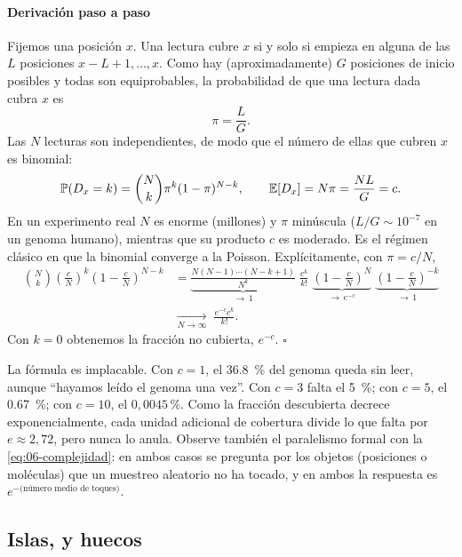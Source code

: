 \paragraph{Derivación paso a paso} Fijemos una posición $x$. Una lectura cubre $x$ si y solo si empieza en alguna de las $L$ posiciones $x-L+1,\dots,x$. Como hay (aproximadamente) $G$ posiciones de inicio posibles y todas son equiprobables, la probabilidad de que una lectura dada cubra $x$ es
\[
\pi = \frac{L}{G}.
\]
Las $N$ lecturas son independientes, de modo que el número de ellas que cubren $x$ es binomial:
\[
\mathbb{P}(D_x=k)=\binom{N}{k}\pi^k(1-\pi)^{N-k},\qquad \mathbb{E}[D_x]=N\pi=\frac{NL}{G}=c.
\]
En un experimento real $N$ es enorme (millones) y $\pi$ minúscula ($L/G\sim10^{-7}$ en un genoma humano), mientras que su producto $c$ es moderado. Es el régimen clásico en que la binomial converge a la Poisson. Explícitamente, con $\pi=c/N$,
\[
\begin{aligned}
\binom{N}{k}\left(\frac{c}{N}\right)^k\left(1-\frac{c}{N}\right)^{N-k}
&= \underbrace{\frac{N(N-1)\cdots(N-k+1)}{N^k}}_{\to\,1}\;\frac{c^k}{k!}\;
\underbrace{\left(1-\frac{c}{N}\right)^{N}}_{\to\,e^{-c}}\;
\underbrace{\left(1-\frac{c}{N}\right)^{-k}}_{\to\,1}\\[4pt]
&\xrightarrow[N\to\infty]{}\;\frac{e^{-c}c^k}{k!}.
\end{aligned}
\]
Con $k=0$ obtenemos la fracción no cubierta, $e^{-c}$. $\square$

\begin{simbolos}
\end{simbolos}

La fórmula es implacable. Con $c=1$, el \SI{36,8}{\percent} del genoma queda sin leer, aunque ``hayamos leído el genoma una vez''. Con $c=3$ falta el \SI{5}{\percent}; con $c=5$, el \SI{0,67}{\percent}; con $c=10$, el $0{,}0045\,\%$. Como la fracción descubierta decrece exponencialmente, cada unidad adicional de cobertura divide lo que falta por $e\approx2{,}72$, pero nunca lo anula. Observe también el paralelismo formal con la \cref{eq:06-complejidad}: en ambos casos se pregunta por los objetos (posiciones o moléculas) que un muestreo aleatorio no ha tocado, y en ambos la respuesta es $e^{-\text{(número medio de toques)}}$.

\subsection{Islas,  y huecos}

